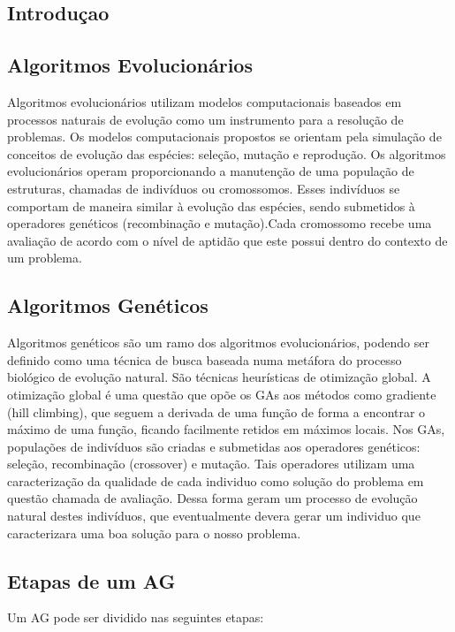 \documentclass[twoside]{article}
\begin{document}
\begin{multicols}{2} %

\section{Introduçao}

\subsection{Algoritmos Evolucionários}
Algoritmos evolucionários utilizam modelos computacionais baseados em processos naturais de evolução como um instrumento para a resolução de problemas. Os modelos computacionais propostos se orientam pela simulação de conceitos de evolução das espécies: seleção, mutação e reprodução. Os algoritmos evolucionários operam proporcionando a manutenção de uma população de estruturas, chamadas de indivíduos ou cromossomos. Esses indivíduos se comportam de maneira similar à evolução das espécies, sendo submetidos à operadores genéticos (recombinação e mutação).Cada cromossomo recebe uma avaliação de acordo com o nível de aptidão que este possui dentro do contexto de um problema.

\subsection{Algoritmos Genéticos}
Algoritmos genéticos são um ramo dos algoritmos evolucionários, podendo ser definido como uma técnica de busca baseada numa metáfora do processo biológico de evolução natural. São técnicas heurísticas de otimização global. A otimização global é uma questão que opõe os GAs aos métodos como gradiente (hill climbing), que seguem a derivada de uma função de forma a encontrar o máximo de uma função, ficando facilmente retidos em máximos locais. Nos GAs, populações de indivíduos são criadas e submetidas aos operadores genéticos: seleção, recombinação (crossover) e mutação. Tais operadores utilizam uma caracterização da qualidade de cada individuo como solução do problema em questão chamada de avaliação. Dessa forma geram um processo de evolução natural destes indivíduos, que eventualmente devera gerar um individuo que caracterizara uma boa solução para o nosso problema.

\subsection{Etapas de um AG}
Um AG pode ser dividido nas seguintes etapas:


\end{multicols}
\end{document}

